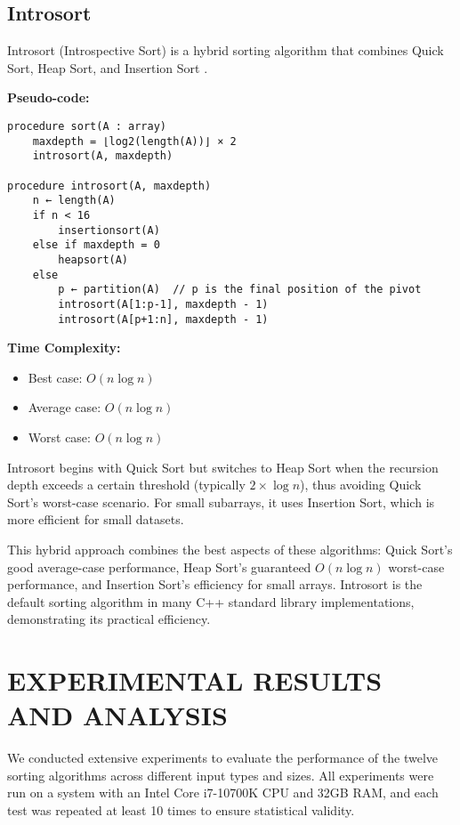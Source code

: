 \documentclass[sigconf]{acmart}
\begin{document}
\subsection{Introsort}
Introsort (Introspective Sort) is a hybrid sorting algorithm that combines Quick Sort, Heap Sort, and Insertion Sort \cite{introsort, musser1997introspective}.

\textbf{Pseudo-code:}
\begin{verbatim}
procedure sort(A : array)
    maxdepth = ⌊log2(length(A))⌋ × 2
    introsort(A, maxdepth)

procedure introsort(A, maxdepth)
    n ← length(A)
    if n < 16
        insertionsort(A)
    else if maxdepth = 0
        heapsort(A)
    else
        p ← partition(A)  // p is the final position of the pivot
        introsort(A[1:p-1], maxdepth - 1)
        introsort(A[p+1:n], maxdepth - 1)
\end{verbatim}

\textbf{Time Complexity:}
\begin{itemize}
    \item Best case: $O(n \log n)$
    \item Average case: $O(n \log n)$
    \item Worst case: $O(n \log n)$
\end{itemize}

Introsort begins with Quick Sort but switches to Heap Sort when the recursion depth exceeds a certain threshold (typically $2 \times \log n$), thus avoiding Quick Sort's worst-case scenario. For small subarrays, it uses Insertion Sort, which is more efficient for small datasets.

This hybrid approach combines the best aspects of these algorithms: Quick Sort's good average-case performance, Heap Sort's guaranteed $O(n \log n)$ worst-case performance, and Insertion Sort's efficiency for small arrays. Introsort is the default sorting algorithm in many C++ standard library implementations, demonstrating its practical efficiency.

\section{EXPERIMENTAL RESULTS AND ANALYSIS}
We conducted extensive experiments to evaluate the performance of the twelve sorting algorithms across different input types and sizes. All experiments were run on a system with an Intel Core i7-10700K CPU and 32GB RAM, and each test was repeated at least 10 times to ensure statistical validity.
\end{document}
